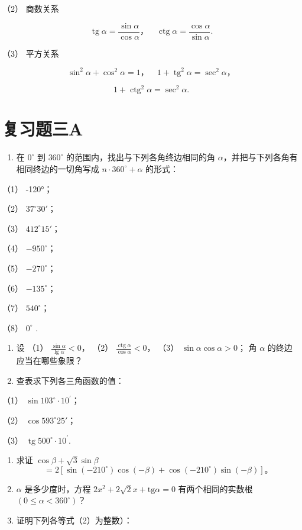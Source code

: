 （2） 商数关系

\[
\operatorname{tg} \alpha = \frac {\sin \alpha}{\cos \alpha}\text{，} \quad \operatorname{ctg} \alpha = \frac {\cos \alpha}{\sin \alpha}.
\]

（3） 平方关系

\[
\sin^ {2} \alpha + \cos^ {2} \alpha = 1\text{，} \quad 1 + \operatorname{tg} ^ {2} \alpha = \sec^ {2} \alpha \text{，}
\]

\[
1 + \operatorname{ctg} ^ {2} \alpha = \sec^ {2} \alpha .
\]

\section{复习题三A}

\begin{enumerate}
\item
  在 \(0^{\circ}\) 到 \(360^{\circ}\)
  的范围内，找出与下列各角终边相同的角
  \(\alpha\)，并把与下列各角有相同终边的一切角写成
  \(n \cdot 360^{\circ} + \alpha\) 的形式：
\end{enumerate}

（1） -120°；

（2） \(37^{\circ}30'\)；

（3） \(412^{\circ}15'\)；

（4） \(-950^{\circ}\)；

（5） \(-270^{\circ}\)；

（6） \(-135^{\circ}\)；

（7） \(540^{\circ}\)；

（8） \(0^{\circ}\) .

\begin{enumerate}[start=2]
\item
  设 （1） \(\frac{\sin \alpha}{\lg \alpha} < 0\)， （2）
  \(\frac{\operatorname{ctg} \alpha}{\cos \alpha} < 0\)， （3）
  \(\sin \alpha \cos \alpha > 0\)； 角 \(\alpha\) 的终边应当在哪些象限？
\item
  查表求下列各三角函数的值：
\end{enumerate}

（1） \(\sin 103^{\circ} \cdot 10^{\prime}\)；

（2） \(\cos 593^{\circ}25'\)；

（3） \(\operatorname{tg} 500^{\circ} \cdot 10^{\prime}\).

\begin{enumerate}[start=4]
\item
  求证 \(\cos \beta + \sqrt{3} \sin \beta\)
\[
= 2 \left[ \sin (- 210 ^{\circ}) \cos (- \beta) + \cos (- 210 ^{\circ}) \sin (- \beta) \right]\text{。}
\]
\item
  \(\alpha\) 是多少度时，方程
  \(2x^{2} + 2\sqrt{2} x + \mathrm{tg}\alpha = 0\) 有两个相同的实数根
  \((0\leqslant \alpha < 360^{\circ})\)？
\item
  证明下列各等式（2）为整数）：
\end{enumerate}


